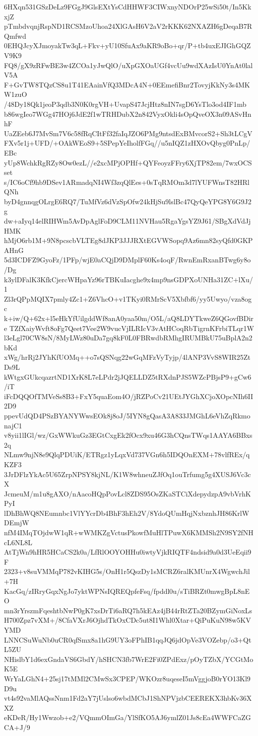 6HXqn531GSzDeLz9FGgJ9GlsEXtYsCdHHWF3CIWxnyNDOrP25wSi50t/In5KkxjZ
pTmbdvqnjRspND1RCSMzoUhoa24XlGAsH6V2aV2rKKK62NXAZH6gDeqaB7RQmfwd
0EHQJcyXJmoyakTw3qL+Fkv+yU10SfuAx9aKR9oBo+qr/P+tb4uxEJIGhGQZV9K9
FQ8/gX9zRFwBE3w4ZCOa1yJwQlO/uXpGXOaUGf4vcUu9wdXAzIsU0YnAt0lalV5A
F+GvTW8TQzCS8u1T41EAainVfQ3MDcA4N+0EEmefiBnr2TovyjKkNy3s4MKW1zuO
/48Dy18Qk1jeoP3qdb3N0K0rgVH+UvapS47JcjHtz8nIN7sgD6YsTlo3od4IF1mb
b86wgIeo7WGg47HOj6JdE2f1wTRHDubX2n842VyxOkli4sOpQveOX3n09ASvHnhF
UaZEeb6J7MvSm7V6c58fRqCItFf32faIqJZO6PMg9ntsdExBMvcorS2+Sh3tLCgV
FXv5r1j+UFD/+OAkWEoS9+5SPepYeIholfFGq//u5nIQZ1zHXOvQbyg0PnLp/EBc
yUp8WchkRgRZy8Ow0ezL//e2xcMPjOPHf+QYFeoyzFFry6XjTP82em/7wxOCSset
s/IC6oCf9hb9DSev1ARmadqNI4Wf3zqQlEes+0sTqRMOm3d7lYUFWnsT82HRlQNh
byD4gnnqgOLrgE6RQ7/TuMfVz6dVzSpOfw24kHjSu9lslBc47QyQeYPG8Y6G9J2g
dw+aIyq14elRIHWm5AvDpAglFoD9CLM11NVHau5RgaYgsYZ9J61/SBgXdVdJjHMK
hMjO6rb1M+9N8pcscbVLTEg8dJKP3JJJRXtEGVWSopq9Az6mn82syQfd0GKPAHnG
5d3ICDFZ9GyoFz/1PFp/wjE0aCQjD9DMplF60Ks4oqF/RwnEmRxanBTwg6y8o/Dg
k3ylDFalK3KfkCjercWHpaYz96rTBKuIacghe9x4mp9nsGDPXoUNHa31ZC+lXu/1
Zl3rQPpMQIX7pmly4Zc1+Z6VhcO+v1TKyi0RMrScV5Xbfbf6/yy5Uwyo/vza8ogc
k+iw/Q+62x+l5eHkYfUilgddWf8anA0yaa50m/O5L/aQ8LDYTkweZ6QGovfBDire
TZfXaiyWvft8oFg7Qeet7Vee2W9vucVjILRIcV3vAtHCoqRbTigrnKFrbiTLqr1W
l3eLgl70CW8sN/8MyLWz80uDa7gq8kF0L0FBRwdbRMhgIRUMBkU75uBplA2n2bKd
xWg/hrRj2JYhKfUOMq++o7sQSNqg22wGqMFzVyTyjp/4lANP3VvS8WIR25ZtDs9L
kWtgxGUkcqazrtND1XrK8L7eLPdr2jJQELLDZ5tRXdnPJS5WZcPBjsP9+gCw6/iT
iFcDQQOfTMVeSs8B3+FxY5quaEom4O/jRZPoCv21UEtJYGhXCjoXOpcNIh6II2D9
ppevUdQD4PSzBYANYWwsEOk8j8oJ/5IYN8gQasA3A833JMGhL6eVhZqRkmonajC1
v8yii1lIGl/wz/GxWWkuGz3EGtCxgEk2fOcx9xu46G3hCQnsTWqs1AAYA6BBxs2q
NLmw9njN8e9QlqPDUiK/ETRgz1yLqxVd737VGn6h5IDQOnEXM+78vlfREx/qKZF3
3JrDFlzYkAc5U65ZrpNPSY8kjNL/K1W8whneuZJfOq1ouTrfumg5g4XUSJ6Vc3cX
JcmeuM/m1u8gAXO/nAacoHQpPovLcl8ZDS95OsZKaSTCiXdepydzpA9vbVrhKPyI
lDhBhWQ8NEumnbc1VlYYcrDb4BhF3hEh2V/8YdoQUmHqjNxbznhJH86KrlWDEmjW
nfM4IMqTOjdwW1qR+wWMKZgVctusPkowfMuHlTPuwX6KMMSh2N9SY2fNHcL6NL8L
AtTjWn9hHR5HCaCS2k0a/LfRlOOYOHHu0iwtyVjkRIQTF4ndsid9a0d3UeEqii9F
2323+v8suVMMqP782vKIHG5s/OnH1r5QszDy1sMCRZ6ralKMUnrX4WgwchJil+7H
KacGq/zIRryGqxNgJo7yktWPNsIQREQpfeFsq/fpddl0u/sTiBRZt0mwgBpL8nEO
mn3rYrszmFqeshtbNwP0gK7xsDrTi6aRQ7h5kEAz4jB44rRtZTa20BZymGiNoxLs
H700Zpz7vXM+/8CfaVXrJ6OjhdTkOxCDc5ut8I1Whl0Xtar+QiPuKuN98w5KVYMD
LNNCSuWuNb0uCR0qfSmx8a1hG9UY3oFPhIB1qqJQ6jdOpVe3VOZebp/o3+QtL5ZU
NHislbY1d6exGndaVS6GbdY/hSHCN3fb7WrE2Fi0ZPdExz/pOyTZbX/YCGtMoK5E
WrYaLGhN4+25sj17tMMl2CMwSx3CPEP/WKOzr8uqeseI5mVggjoB0rYO13Kl9D9u
vt4s92vaMlAQssNnm1Fd2aY7jUslso6wbdMCbJ1ShNPVjzbCEEREKX3hbKv36XXZ
eKDeR/Hy1Wwzob+e2/VQmmOImGa/YlSfKO5AJ6ymlZ01Js8cEa4WWFCaZGCA+J/9
